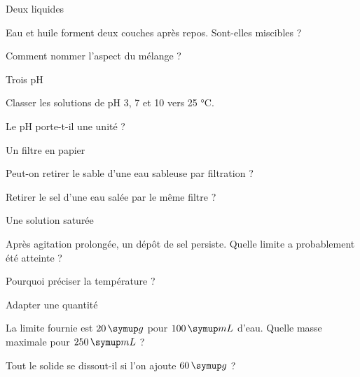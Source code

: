 \par\noindent\begin{minipage}{\linewidth}
\begin{exercice}[1]{Deux liquides}
\begin{questions}
\item Eau et huile forment deux couches après repos. Sont-elles miscibles ?
\item Comment nommer l’aspect du mélange ?
\end{questions}
\end{exercice}
\end{minipage}
\par\noindent\begin{minipage}{\linewidth}
\begin{exercice}[1]{Trois pH}
\begin{questions}
\item Classer les solutions de pH 3, 7 et 10 vers 25 °C.
\item Le pH porte-t-il une unité ?
\end{questions}
\end{exercice}
\end{minipage}
\par\noindent\begin{minipage}{\linewidth}
\begin{exercice}[1]{Un filtre en papier}
\begin{questions}
\item Peut-on retirer le sable d’une eau sableuse par filtration ?
\item Retirer le sel d’une eau salée par le même filtre ?
\end{questions}
\end{exercice}
\end{minipage}
\par\noindent\begin{minipage}{\linewidth}
\begin{exercice}[1]{Une solution saturée}
\begin{questions}
\item Après agitation prolongée, un dépôt de sel persiste. Quelle limite a probablement été atteinte ?
\item Pourquoi préciser la température ?
\end{questions}
\end{exercice}
\end{minipage}
\clearpage{}
\par\noindent\begin{minipage}{\linewidth}
\begin{exercice}[2]{Adapter une quantité}
\begin{questions}
\item La limite fournie est $20\unite g$ pour $100\unite{mL}$ d’eau. Quelle masse maximale pour $250\unite{mL}$ ?
\item Tout le solide se dissout-il si l’on ajoute $60\unite g$ ?
\end{questions}
\end{exercice}
\end{minipage}
